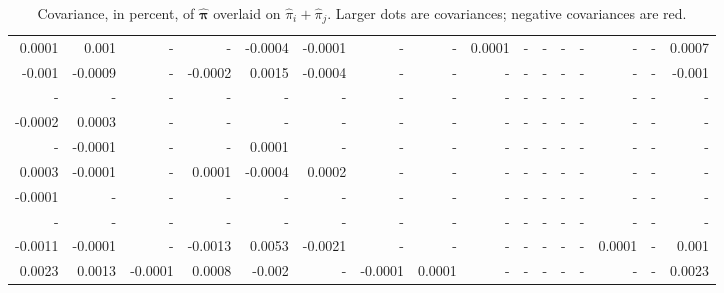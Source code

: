 \documentclass[12pt]{amsart}
\newcommand{\vect}[1]{\boldsymbol{\mathbf{#1}}}
\newcommand{\vph}{\hat{\vect{\pi}}}
\begin{document}
\begin{table}[h]\tiny
\caption{Covariance, in percent, of $\vph$ overlaid on $\hat{\pi}_i + \hat{\pi}_j$. Larger dots are covariances; negative covariances are red.}
	\begin{center}
		\begin{tabular}{r r r r r r r r r r r r r r r r}
			 0.0001   &     0.001    &       -  &        -  &   -0.0004   &   -0.0001   &        -  &        -   &   0.0001     &      -     &     -  &        -  &        -  &        -    &      -   &   0.0007         \\
 -0.001   &   -0.0009    &       -  &   -0.0002   &    0.0015   &   -0.0004   &        -  &        -   &       -    &      -     &     -  &        -  &        -  &        -    &      -   &   -0.001         \\
     -  &        -   &       -  &        -  &        -  &        -  &        -  &        -   &       -    &      -     &     -  &        -  &        -  &        -    &      -   &       -        \\
-0.0002   &    0.0003    &       -  &        -  &        -  &        -  &        -  &        -   &       -    &      -     &     -  &        -  &        -  &        -    &      -   &       -        \\
     -  &   -0.0001    &       -  &        -  &    0.0001   &        -  &        -  &        -   &       -    &      -     &     -  &        -  &        -  &        -    &      -   &       -        \\
 0.0003   &   -0.0001    &       -  &    0.0001   &   -0.0004   &    0.0002   &        -  &        -   &       -    &      -     &     -  &        -  &        -  &        -    &      -   &       -        \\
-0.0001   &        -   &       -  &        -  &        -  &        -  &        -  &        -   &       -    &      -     &     -  &        -  &        -  &        -    &      -   &       -        \\
     -  &        -   &       -  &        -  &        -  &        -  &        -  &        -   &       -    &      -     &     -  &        -  &        -  &        -    &      -   &       -        \\
-0.0011   &   -0.0001    &       -  &   -0.0013   &    0.0053   &   -0.0021   &        -  &        -   &       -    &      -     &     -  &        -  &        -  &    0.0001     &      -   &    0.001         \\
 0.0023   &    0.0013    &  -0.0001   &    0.0008   &    -0.002   &        -  &   -0.0001   &    0.0001    &       -    &      -     &     -  &        -  &        -  &        -    &      -   &   0.0023         \\

\end{tabular}
\end{center}
\end{table}
\end{document}
